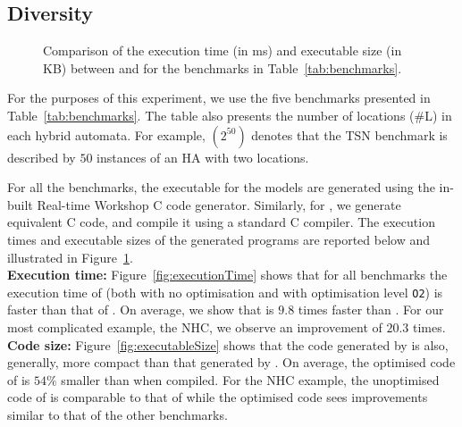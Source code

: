 \subsection{Diversity}
\label{sec:diversity}

\begin{figure}[htbp]
	\centering
	\caption{Comparison of the execution time (in ms) and executable size (in KB) between \simulink and \ourTool for the benchmarks in Table~\ref{tab:benchmarks}.}
	\label{fig:results}
\end{figure}

For the purposes of this experiment, we use the five benchmarks presented in Table~\ref{tab:benchmarks}.
The table also presents the number of locations (\#L) in each hybrid automata.
For example, $(2^{50})$ denotes that the \acf{TSN} benchmark is described by $50$ instances of an \ac{HA} with two locations.

For all the benchmarks, the executable for the \simulink models are generated using the in-built Real-time Workshop\textsuperscript{\textregistered} C code generator.
Similarly, for \ourTool, we generate equivalent C code, and compile it using a standard C compiler.
The execution times and executable sizes of the generated programs are reported below and illustrated in Figure~\ref{fig:results}.\\

\textbf{Execution time:} 
Figure~\ref{fig:executionTime} shows that for all benchmarks the execution time of \ourTool (both with no optimisation and with optimisation level \texttt{O2}) is faster than that of \simulink.
On average, we show that \ourTool is $9.8$ times faster than \simulink.
For our most complicated example, the \ac{NHC}, we observe an improvement of $20.3$ times.\\

\textbf{Code size:}
Figure~\ref{fig:executableSize} shows that the code generated by \ourTool is also, generally, more compact than that generated by \simulink.
On average, the optimised code of \ourTool is $54\%$ smaller than \simulink when compiled.
For the \ac{NHC} example, the unoptimised code of \ourTool is comparable to that of \simulink while the optimised code sees improvements similar to that of the other benchmarks.\\

